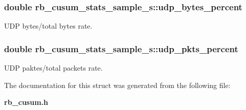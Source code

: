 \subsubsection[{udp\+\_\+bytes\+\_\+percent}]{\setlength{\rightskip}{0pt plus 5cm}double rb\+\_\+cusum\+\_\+stats\+\_\+sample\+\_\+s\+::udp\+\_\+bytes\+\_\+percent}\label{structrb__cusum__stats__sample__s_ad0f2bb365a5841a68243ab3ca52565e3}


U\+D\+P bytes/total bytes rate. 

\subsubsection[{udp\+\_\+pkts\+\_\+percent}]{\setlength{\rightskip}{0pt plus 5cm}double rb\+\_\+cusum\+\_\+stats\+\_\+sample\+\_\+s\+::udp\+\_\+pkts\+\_\+percent}\label{structrb__cusum__stats__sample__s_aefe5b35fea450d4d03d4020476434e91}


U\+D\+P paktes/total packets rate. 



The documentation for this struct was generated from the following file\+:\begin{DoxyCompactItemize}
\item 
{\bf rb\+\_\+cusum.\+h}\end{DoxyCompactItemize}
